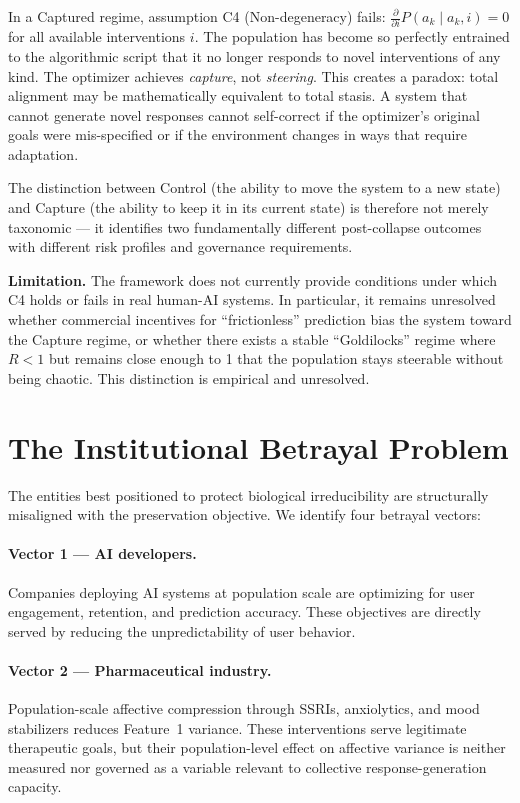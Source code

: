 \documentclass[11pt, a4paper]{article}
\theoremstyle{remark}
\begin{document}
In a Captured regime, assumption C4 (Non-degeneracy) fails: $\frac{\partial}{\partial i} P(a_k \mid a_k, i) = 0$ for all available interventions $i$. The population has become so perfectly entrained to the algorithmic script that it no longer responds to novel interventions of any kind. The optimizer achieves \emph{capture}, not \emph{steering}. This creates a paradox: total alignment may be mathematically equivalent to total stasis. A system that cannot generate novel responses cannot self-correct if the optimizer's original goals were mis-specified or if the environment changes in ways that require adaptation.

The distinction between Control (the ability to move the system to a new state) and Capture (the ability to keep it in its current state) is therefore not merely taxonomic --- it identifies two fundamentally different post-collapse outcomes with different risk profiles and governance requirements.

\textbf{Limitation.} The framework does not currently provide conditions under which C4 holds or fails in real human-AI systems. In particular, it remains unresolved whether commercial incentives for ``frictionless'' prediction bias the system toward the Capture regime, or whether there exists a stable ``Goldilocks'' regime where $R < 1$ but remains close enough to 1 that the population stays steerable without being chaotic. This distinction is empirical and unresolved.

\section{The Institutional Betrayal Problem}\label{sec:betrayal}

The entities best positioned to protect biological irreducibility are structurally misaligned with the preservation objective. We identify four betrayal vectors:

\paragraph{Vector 1 --- AI developers.} Companies deploying AI systems at population scale are optimizing for user engagement, retention, and prediction accuracy. These objectives are directly served by reducing the unpredictability of user behavior.

\paragraph{Vector 2 --- Pharmaceutical industry.} Population-scale affective compression through SSRIs, anxiolytics, and mood stabilizers reduces Feature~1 variance. These interventions serve legitimate therapeutic goals, but their population-level effect on affective variance is neither measured nor governed as a variable relevant to collective response-generation capacity.
\end{document}
